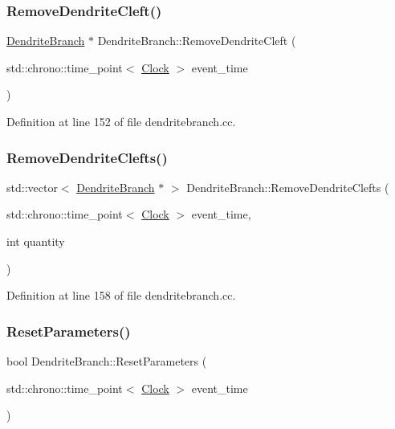 \subsubsection{\texorpdfstring{Remove\+Dendrite\+Cleft()}{RemoveDendriteCleft()}}
{\footnotesize\ttfamily \mbox{\hyperlink{class_dendrite_branch}{Dendrite\+Branch}} $\ast$ Dendrite\+Branch\+::\+Remove\+Dendrite\+Cleft (\begin{DoxyParamCaption}\item[{std\+::chrono\+::time\+\_\+point$<$ \mbox{\hyperlink{universe_8h_a0ef8d951d1ca5ab3cfaf7ab4c7a6fd80}{Clock}} $>$}]{event\+\_\+time }\end{DoxyParamCaption})}



Definition at line 152 of file dendritebranch.\+cc.

\mbox{\label{class_dendrite_branch_acd54003e5acb9abda7d7a42f248c14b0}} 
\subsubsection{\texorpdfstring{Remove\+Dendrite\+Clefts()}{RemoveDendriteClefts()}}
{\footnotesize\ttfamily std\+::vector$<$ \mbox{\hyperlink{class_dendrite_branch}{Dendrite\+Branch}} $\ast$ $>$ Dendrite\+Branch\+::\+Remove\+Dendrite\+Clefts (\begin{DoxyParamCaption}\item[{std\+::chrono\+::time\+\_\+point$<$ \mbox{\hyperlink{universe_8h_a0ef8d951d1ca5ab3cfaf7ab4c7a6fd80}{Clock}} $>$}]{event\+\_\+time,  }\item[{int}]{quantity }\end{DoxyParamCaption})}



Definition at line 158 of file dendritebranch.\+cc.

\mbox{\label{class_dendrite_branch_a70b5e63fc44166ccd7f0c7177660c250}} 
\subsubsection{\texorpdfstring{Reset\+Parameters()}{ResetParameters()}}
{\footnotesize\ttfamily bool Dendrite\+Branch\+::\+Reset\+Parameters (\begin{DoxyParamCaption}\item[{std\+::chrono\+::time\+\_\+point$<$ \mbox{\hyperlink{universe_8h_a0ef8d951d1ca5ab3cfaf7ab4c7a6fd80}{Clock}} $>$}]{event\+\_\+time }\end{DoxyParamCaption})}



